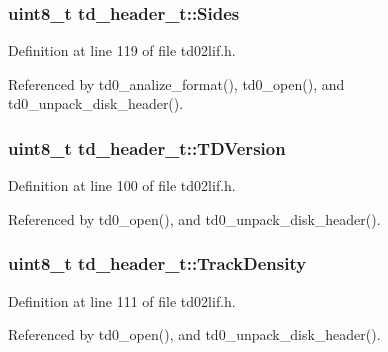 \subsubsection[{\texorpdfstring{Sides}{Sides}}]{\setlength{\rightskip}{0pt plus 5cm}uint8\+\_\+t td\+\_\+header\+\_\+t\+::\+Sides}\hypertarget{structtd__header__t_a8b188d880b5d9d94122674265b0ca3e6}{}\label{structtd__header__t_a8b188d880b5d9d94122674265b0ca3e6}


Definition at line 119 of file td02lif.\+h.



Referenced by td0\+\_\+analize\+\_\+format(), td0\+\_\+open(), and td0\+\_\+unpack\+\_\+disk\+\_\+header().

\subsubsection[{\texorpdfstring{T\+D\+Version}{TDVersion}}]{\setlength{\rightskip}{0pt plus 5cm}uint8\+\_\+t td\+\_\+header\+\_\+t\+::\+T\+D\+Version}\hypertarget{structtd__header__t_ac63e3625279d7262e3d094c0c5e5753a}{}\label{structtd__header__t_ac63e3625279d7262e3d094c0c5e5753a}


Definition at line 100 of file td02lif.\+h.



Referenced by td0\+\_\+open(), and td0\+\_\+unpack\+\_\+disk\+\_\+header().

\subsubsection[{\texorpdfstring{Track\+Density}{TrackDensity}}]{\setlength{\rightskip}{0pt plus 5cm}uint8\+\_\+t td\+\_\+header\+\_\+t\+::\+Track\+Density}\hypertarget{structtd__header__t_a2d1461bb956665d519d33fca629477ab}{}\label{structtd__header__t_a2d1461bb956665d519d33fca629477ab}


Definition at line 111 of file td02lif.\+h.



Referenced by td0\+\_\+open(), and td0\+\_\+unpack\+\_\+disk\+\_\+header().

